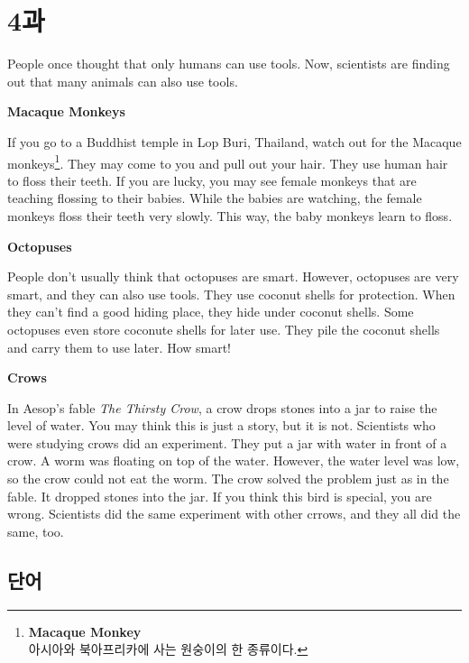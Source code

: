 \documentclass[9pt, a4paper]{oblivoir}
\begin{document}
        \section*{4과}

        People once thought that only humans can use tools. Now, scientists are finding out that many animals can also use tools. \newline

        \textbf{Macaque Monkeys}

        If you go to a Buddhist temple in Lop Buri, Thailand, watch out for the Macaque monkeys\footnote{\textbf{Macaque Monkey}\\아시아와 북아프리카에 사는 원숭이의 한 종류이다.}. 
        They may come to you and pull out your hair. They use human hair to floss their teeth.
        If you are lucky, you may see female monkeys that are teaching flossing to their babies. 
        While the babies are watching, the female monkeys floss their teeth very slowly. This way, the baby monkeys learn to floss. \newline

        \textbf{Octopuses}

        People don't usually think that octopuses are smart. However, octopuses are very smart, and they can also use tools.
        They use coconut shells for protection. When they can't find a good hiding place, they hide under coconut shells. Some octopuses even store coconute shells for later use.
        They pile the coconut shells and carry them to use later. How smart! \newline

        \textbf{Crows}

        In Aesop's fable \emph{The Thirsty Crow}, a crow drops stones into a jar to raise the level of water. 
        You may think this is just a story, but it is not. Scientists who were studying crows did an experiment.
        They put a jar with water in front of a crow. A worm was floating on top of the water. However, the water level was low, so the crow could not eat the worm. The crow solved the problem just as in the fable. 
        It dropped stones into the jar. If you think this bird is special, you are wrong.
        Scientists did the same experiment with other crrows, and they all did the same, too. \bigskip 
        \vspace*{4cm}
        
        \subsection*{단어}
\end{document}
